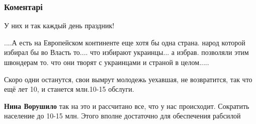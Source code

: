  
 
 
 
 
\subsubsection{Коментарі}
\label{sec:30_08_2021.fb.vasilec_dmitrij.1.den_oligarhata_nezalezhnist.cmt}

\begin{itemize}
 
У них и так каждый день праздник!

 

....А есть на Европейском континенте еще хотя бы одна страна. народ которой
избирал бы во Власть то.... что избирают украинцы... а избрав. позволяли этим
швондерам то. что они творят с украинцами и страной в целом.....


 
Скоро одни останутся, свои вымрут молодежь уехавшая, не возвратится, так что
ещё лет 10, и станется млн.10-15 обслуги.

\begin{itemize}
 
\textbf{Нина Ворушило} так на это и рассчитано все, что у нас происходит. Сократить население до 10-15 млн. Этого вполне достаточно для обеспечения рабсилой
\end{itemize}


\end{itemize}
